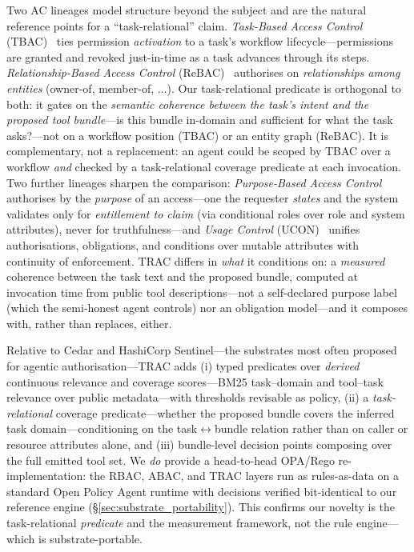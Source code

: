 \documentclass[sigconf,review,anonymous]{acmart}
\begin{document}
Two AC lineages model structure beyond the subject and are the natural reference points for a ``task-relational'' claim. \emph{Task-Based Access Control} (TBAC)~\cite{thomas1997tbac} ties permission \emph{activation} to a task's workflow lifecycle---permissions are granted and revoked just-in-time as a task advances through its steps. \emph{Relationship-Based Access Control} (ReBAC)~\cite{fong2011rebac} authorises on \emph{relationships among entities} (owner-of, member-of, $\dots$). Our task-relational predicate is orthogonal to both: it gates on the \emph{semantic coherence between the task's intent and the proposed tool bundle}---is this bundle in-domain and sufficient for what the task asks?---not on a workflow position (TBAC) or an entity graph (ReBAC). It is complementary, not a replacement: an agent could be scoped by TBAC over a workflow \emph{and} checked by a task-relational coverage predicate at each invocation. Two further lineages sharpen the comparison: \emph{Purpose-Based Access Control}~\cite{byun2005purpose} authorises by the \emph{purpose} of an access---one the requester \emph{states} and the system validates only for \emph{entitlement to claim} (via conditional roles over role and system attributes), never for truthfulness---and \emph{Usage Control} (UCON)~\cite{park2004ucon} unifies authorisations, obligations, and conditions over mutable attributes with continuity of enforcement. TRAC differs in \emph{what} it conditions on: a \emph{measured} coherence between the task text and the proposed bundle, computed at invocation time from public tool descriptions---not a self-declared purpose label (which the semi-honest agent controls) nor an obligation model---and it composes with, rather than replaces, either.

Relative to Cedar and HashiCorp Sentinel---the substrates most often proposed for agentic authorisation---TRAC adds (i) typed predicates over \emph{derived} continuous relevance and coverage scores---BM25 task--domain and tool--task relevance over public metadata---with thresholds revisable as policy, (ii) a \emph{task-relational} coverage predicate---whether the proposed bundle covers the inferred task domain---conditioning on the task$\leftrightarrow$bundle relation rather than on caller or resource attributes alone, and (iii) bundle-level decision points composing over the full emitted tool set. We \emph{do} provide a head-to-head OPA/Rego re-implementation: the RBAC, ABAC, and TRAC layers run as rules-as-data on a standard Open Policy Agent runtime with decisions verified bit-identical to our reference engine (\S\ref{sec:substrate_portability}). This confirms our novelty is the task-relational \emph{predicate} and the measurement framework, not the rule engine---which is substrate-portable.
\end{document}
